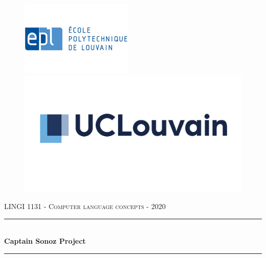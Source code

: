 
\begin{titlepage}

  \begin{sffamily}
  
  \begin{center}  
        
        \begin{figure}[h]
            \begin{minipage}[c]{0.5\textwidth}
            \flushleft
            \includegraphics[scale=0.8]{Structure/LogoEPL.jpg}
            \end{minipage}%
            \begin{minipage}[c]{0.5\textwidth}
            \includegraphics[scale=0.37]{Structure/LogoUCLouvain2.jpg}
            \flushright 
            \end{minipage}
        \end{figure}
        
\vfill

        \textsc{\LARGE LINGI 1131  - Computer language concepts -  2020}\\[0.3cm]
        \rule{16cm}{1pt}
        \medskip
        \\
        { \huge \bfseries Captain Sonoz Project \\[0.2cm] }
        \rule{16cm}{1pt}
        \\
    

\end{center}
\end{sffamily}
\end{titlepage}
